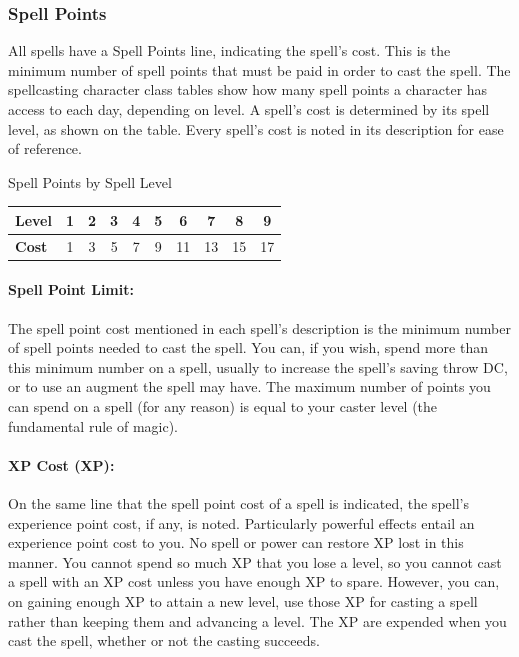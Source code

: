 \subsubsection{Spell Points}
All spells have a Spell Points line, indicating the spell's cost. This is the minimum number of spell points that must be paid in order to cast the spell.
The spellcasting character class tables show how many spell points a character has access to each day, depending on level.
A spell's cost is determined by its spell level, as shown on the  table. 
Every spell's cost is noted in its description for ease of reference.
\begin{tableonecolumn}
\caption{Spell Points by Spell Level}
\label{tab:SpellPointsBySpellLevel}
\begin{tabular}{l*{9}{c}}
\toprule
\textbf{Level}&1&2&3&4&5&6&7&8&9\\
\midrule
\textbf{Cost}&1&3&5&7&9&11&13&15&17\\
\bottomrule
\end{tabular}
\end{tableonecolumn}

\paragraph{Spell Point Limit:} 
The spell point cost mentioned in each spell's description is the minimum number of spell points needed to cast the spell. 
You can, if you wish, spend more than this minimum number on a spell, usually to increase the spell's saving throw DC, or to use an augment the spell may have.
The maximum number of points you can spend on a spell (for any reason) is equal to your caster level (the fundamental rule of magic).

\paragraph{XP Cost (XP):} On the same line that the spell point cost of a spell is indicated, the spell's experience point cost, if any, is noted. Particularly powerful effects entail an experience point cost to you. No spell or power can restore XP lost in this manner. You cannot spend so much XP that you lose a level, so you cannot cast a spell with an XP cost unless you have enough XP to spare. However, you can, on gaining enough XP to attain a new level, use those XP for casting a spell rather than keeping them and advancing a level. The XP are expended when you cast the spell, whether or not the casting succeeds.

